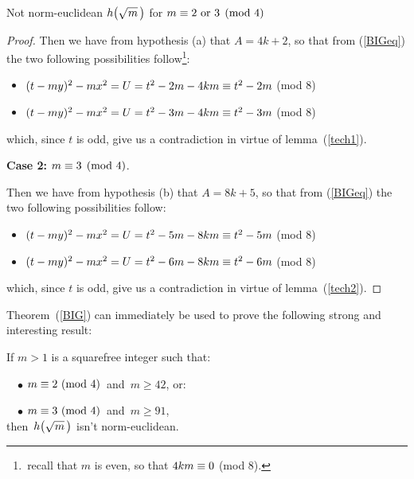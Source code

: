 \begin{subsection}{Not norm-euclidean $\hh{m}$ for %
                   $m \equiv 2 \text{ or } 3 \pmod 4$}
\begin{proof}
Then we have from hypothesis {\rm\textsf{(a)}} that
$A = 4k + 2$, so that from (\ref{BIGeq}) the two following
possibilities follow\footnote{\,recall that $m$
is even, so that $4km \equiv 0$ (mod $8$).}:

\begin{itemize}

\item $(t - my)^2 - mx^2 = U = t^2 - 2m - 4km \equiv
t^2 - 2m$ (mod $8$)

\item $(t - my)^2 - mx^2 = U = t^2 - 3m - 4km \equiv
t^2 - 3m$ (mod $8$)

\end{itemize}
which, since $t$ is odd, give us a contradiction in
virtue of lemma~(\ref{tech1}).

\medskip
\textbf{Case 2\::}\: $m \equiv 3 \pmod 4$.

Then we have from hypothesis {\rm\textsf{(b)}} that
$A = 8k + 5$, so that from (\ref{BIGeq}) the
two following possibilities follow:

\begin{itemize}

\item $(t - my)^2 - mx^2 = U = t^2 - 5m - 8km \equiv
t^2 - 5m$ (mod $8$)

\item $(t - my)^2 - mx^2 = U = t^2 - 6m - 8km \equiv
t^2 - 6m$ (mod $8$)

\end{itemize}
which, since $t$ is odd, give us a contradiction in
virtue of lemma~(\ref{tech2}).
%
\end{proof}


\medskip
Theorem~(\ref{BIG}) can immediately be used to prove the following
strong and interesting result:

%
%
\begin{thm}\label{limits_for_norm-euclidean}
If $m > 1$ is a squarefree integer such that:

~~$\bullet$
$m \equiv 2\ \mathrm{(mod\ 4)}$\, and\, $m \geq 42$, or:

~~$\bullet$
$m \equiv 3\ \mathrm{(mod\ 4)}$\, and\, $m \geq 91$,\\[1.5pt]
%
then\, $\hh{m}$ isn't norm-euclidean.
\end{thm}


\end{subsection}
